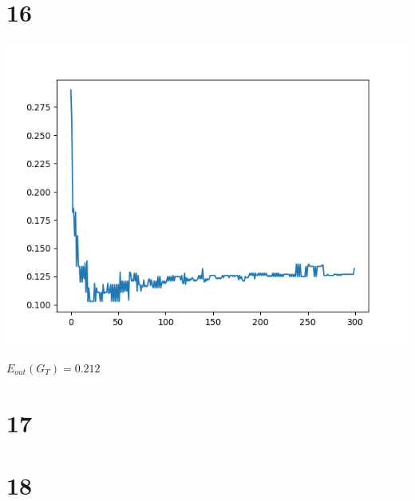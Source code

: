 \documentclass[12pt]{article}
\begin{document}
\section*{16}
\begin{center}
    \includegraphics[scale=0.5]{p16.png}
\end{center}
$E_{out}(G_T) = 0.212$
\section*{17}

\section*{18}
\end{document}
